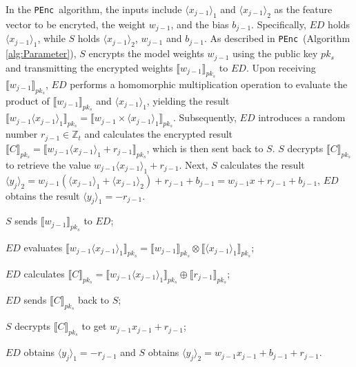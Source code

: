 \documentclass[conference]{IEEEtran}
\newcommand{\PEnc}{\texttt{PEnc}}
\begin{document}
In the \PEnc~algorithm, the inputs include $\langle x_{j-1}\rangle_1$ and $\langle x_{j-1}\rangle_2$ as the feature vector to be encryted, the weight $w_{j-1}$, and the bias $b_{j-1}$. Specifically, $ED$ holds $\langle x_{j-1}\rangle_1$, while $S$ holds $\langle x_{j-1}\rangle_2$, $w_{j-1}$ and $b_{j-1}$. As described in \PEnc~(Algorithm \ref{alg:Parameter}), $S$ encrypts the model weights $w_{j-1}$ using the public key $pk_s$ and transmitting the encrypted weights $\llbracket w_{j-1} \rrbracket_{pk_s}$ to $ED$. Upon receiving $\llbracket w_{j-1} \rrbracket_{pk_s}$, $ED$ performs a homomorphic multiplication operation to evaluate the product of $\llbracket w_{j-1} \rrbracket_{pk_s}$ and $\langle x_{j-1} \rangle_1$, yielding the result $\llbracket w_{j-1} \langle x_{j-1} \rangle_1\rrbracket_{pk_s} = \llbracket w_{j-1} \times \langle x_{j-1} \rangle_1 \rrbracket_{pk_s}$. Subsequently, $ED$ introduces a random number $r_{j-1}\in \mathbb{Z}_t$ and calculates the encrypted result $\llbracket C \rrbracket_{pk_s}=\llbracket w_{j-1} \langle x_{j-1} \rangle_1 + r_{j-1} \rrbracket_{pk_s}$, which is then sent back to $S$. $S$ decrypts $\llbracket C \rrbracket_{pk_s}$ to retrieve the value $w_{j-1}\langle x_{j-1} \rangle_1+r_{j-1}$. Next, $S$ calculates the result $\langle y_j\rangle_2= w_{j-1}(\langle x_{j-1} \rangle_1 + \langle x_{j-1} \rangle_2)+r_{j-1}+b_{j-1}=w_{j-1}x+r_{j-1}+b_{j-1}$, $ED$ obtains the result $\langle y_j\rangle_1=-r_{j-1}$. 
\begin{algorithm}[htbp]
	\caption{\PEnc$(\langle x_{j-1} \rangle_1,\langle x_{j-1} \rangle_2,w_{j-1},b_{j-1}) \rightarrow (\langle y_j\rangle_1, \langle y_j\rangle_2)$}
    \label{alg:Parameter}
    \LinesNumbered
     $S$ sends $\llbracket w_{j-1}\rrbracket_{pk_s}$ to $ED$;
    
     $ED$ evaluates $\llbracket w_{j-1}\langle x_{j-1} \rangle_1 \rrbracket_{pk_s} = \llbracket w_{j-1} \rrbracket_{pk_s} \otimes \llbracket \langle x_{j-1} \rangle_1 \rrbracket_{pk_s}$;
    
     $ED$  calculates $\llbracket C\rrbracket_{pk_s} = \llbracket w_{j-1}\langle x_{j-1} \rangle_1 \rrbracket_{pk_s} \oplus \llbracket r_{j-1} \rrbracket_{pk_s}$;
     
     $ED$ sends $\llbracket C\rrbracket_{pk_s}$ back to $S$;
    
     $S$ decrypts $\llbracket C\rrbracket_{pk_s}$ to get $w_{j-1} x_{j-1} + r_{j-1}$;
     
     $ED$ obtains $\langle y_j\rangle_1=-r_{j-1}$ and $S$ obtains $\langle y_j\rangle_2 = w_{j-1} x_{{j-1}}  + b_{j-1} + r_{j-1}$.
\end{algorithm}
\end{document}
